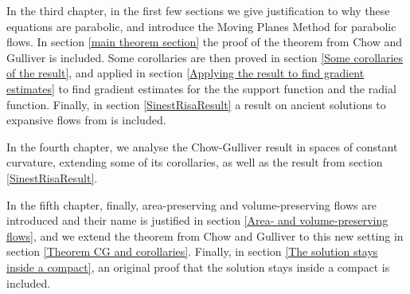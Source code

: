 In the third chapter, in the first few sections we give justification to why these equations are parabolic, and introduce the Moving Planes Method for parabolic flows. In section \ref{main theorem section} the proof of the theorem from Chow and Gulliver is included. Some corollaries are then proved in section \ref{Some corollaries of the result}, and applied in section \ref{Applying the result to find gradient estimates} to find gradient estimates for the the support function and the radial function. Finally, in section \ref{SinestRisaResult} a result on ancient solutions to expansive flows from \cite{SinestRisa} is included. 

In the fourth chapter, we analyse the Chow-Gulliver result in spaces of constant curvature, extending some of its corollaries, as well as the result from section \ref{SinestRisaResult}.

In the fifth chapter, finally, area-preserving and volume-preserving flows are introduced and their name is justified in section \ref{Area- and volume-preserving flows}, and we extend the theorem from Chow and Gulliver to this new setting in section \ref{Theorem CG and corollaries}. Finally, in section \ref{The solution stays inside a compact}, an original proof that the solution stays inside a compact is included.
